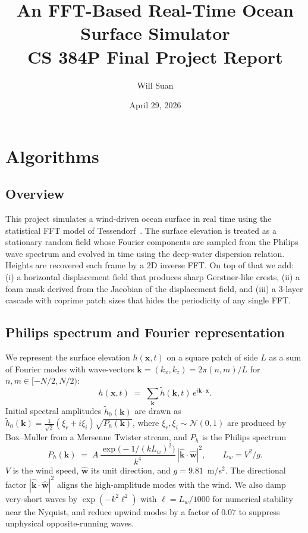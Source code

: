 \documentclass[10pt,letterpaper]{article}
\title{\vspace{-1.2cm}\textbf{An FFT-Based Real-Time Ocean Surface Simulator}\\
\large CS 384P Final Project Report}
\author{Will Suan}
\date{April 29, 2026}
\begin{document}
\maketitle
\vspace{-1.0cm}

\section{Algorithms}

\subsection{Overview}
This project simulates a wind-driven ocean surface in real time using the
statistical FFT model of Tessendorf~\cite{tessendorf}. The surface elevation
is treated as a stationary random field whose Fourier components are sampled
from the Philips wave spectrum and evolved in time using the deep-water
dispersion relation. Heights are recovered each frame by a 2D inverse FFT.
On top of that we add: (i) a horizontal displacement field that produces
sharp Gerstner-like crests, (ii) a foam mask derived from the Jacobian of the
displacement field, and (iii) a 3-layer cascade with coprime patch sizes
that hides the periodicity of any single FFT.

\subsection{Philips spectrum and Fourier representation}
We represent the surface elevation $h(\mathbf{x},t)$ on a square patch of
side $L$ as a sum of Fourier modes with wave-vectors
$\mathbf{k}=(k_x,k_z)=2\pi(n,m)/L$ for $n,m\in[-N/2,N/2)$:
\begin{equation}
  h(\mathbf{x},t) \;=\; \sum_{\mathbf{k}} \tilde{h}(\mathbf{k},t)\,e^{i\mathbf{k}\cdot\mathbf{x}}.
  \label{eq:fourier}
\end{equation}
Initial spectral amplitudes $\tilde{h}_0(\mathbf{k})$ are drawn as
$\tilde{h}_0(\mathbf{k}) = \tfrac{1}{\sqrt{2}}(\xi_r+i\xi_i)\sqrt{P_h(\mathbf{k})}$,
where $\xi_r,\xi_i\sim\mathcal{N}(0,1)$ are produced by Box--Muller from a
Mersenne Twister stream, and $P_h$ is the Philips spectrum
\begin{equation}
  P_h(\mathbf{k}) \;=\; A\,\frac{\exp\!\bigl(-1/(kL_w)^2\bigr)}{k^4}\,
  |\hat{\mathbf{k}}\cdot\hat{\mathbf{w}}|^2,
  \qquad L_w = V^2/g.
  \label{eq:philips}
\end{equation}
$V$ is the wind speed, $\hat{\mathbf{w}}$ its unit direction, and
$g=9.81$~m/s$^2$. The directional factor
$|\hat{\mathbf{k}}\cdot\hat{\mathbf{w}}|^2$ aligns the high-amplitude modes
with the wind. We also damp very-short waves by $\exp(-k^2\ell^2)$ with
$\ell=L_w/1000$ for numerical stability near the Nyquist, and reduce upwind
modes by a factor of $0.07$ to suppress unphysical opposite-running waves.
\end{document}
